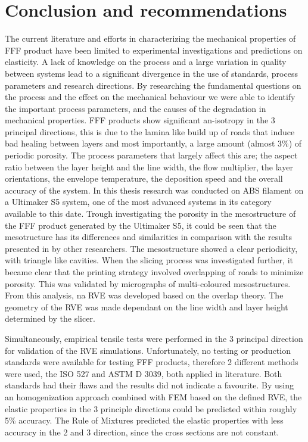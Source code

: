 \chapter{Conclusion and recommendations}
\label{chp:8}

The current literature and efforts in characterizing the mechanical properties of FFF product have been limited to experimental investigations and predictions on elasticity. A lack of knowledge on the process and a large variation in quality between systems lead to a significant divergence in the use of standards, process parameters and research directions. By researching the fundamental questions on the process and the effect on the mechanical behaviour we were able to identify the important process parameters, and the causes of the degradation in mechanical properties. FFF products show significant an-isotropy in the 3 principal directions, this is due to the lamina like build up of roads that induce bad healing between layers and most importantly, a large amount (almost 3\%) of periodic porosity. The process parameters that largely affect this are; the aspect ratio between the layer height and the line width, the flow multiplier, the layer orientations, the envelope temperature, the deposition speed and the overall accuracy of the system.  In this thesis research was conducted on ABS filament on a Ultimaker S5 system, one of the most advanced systems in its category available to this date. Trough investigating the porosity in the mesostructure of the FFF product generated by the Ultimaker S5, it could be seen that the mesotructure has its differences and similarities in comparison with the results presented in by other researchers. The mesostructure showed a clear periodicity, with triangle like cavities. When the slicing process was investigated further, it became clear that the printing strategy involved overlapping of roads to minimize porosity. This was validated by micrographs of multi-coloured mesostructures. From this analysis, na RVE was developed based on the overlap theory. The geometry of the RVE was made dependant on the line width and layer height determined by the slicer. 

Simultaneously, empirical tensile tests were performed in the 3 principal direction for validation of the RVE simulations. Unfortunately, no testing or production standards were available for testing FFF products, therefore 2 different methods were used, the ISO 527 and ASTM D 3039, both applied in literature. Both standards had their flaws and the results did not indicate a favourite.  
By using an homogenization approach combined with FEM based on the defined RVE, the elastic properties in the 3 principle directions could be predicted within roughly 5\% accuracy. The Rule of Mixtures predicted the elastic properties with less accuracy in the 2 and 3 direction, since the cross sections are not constant. 

